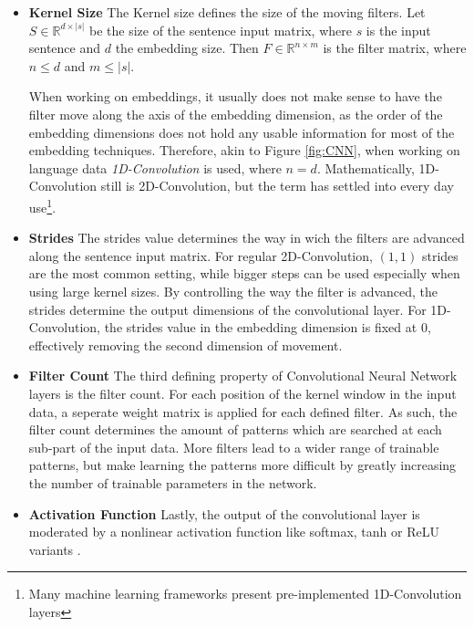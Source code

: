 \documentclass[11pt,a4paper,twoside,openright]{scrbook}
\begin{document}
\begin{itemize}
  \item \textbf{Kernel Size}
    The Kernel size defines the size of the moving filters. Let \(S \in \mathbb{R}^{d\times |s|}\) be the size of the sentence input matrix, where \(s\) is the input sentence and \(d\) the embedding size.
    Then \(F \in \mathbb{R}^{n \times m}\) is the filter matrix, where \(n \leq d\) and \(m \leq |s|\).

    When working on embeddings, it usually does not make sense to have the filter move along the axis of the embedding dimension, as the order of the embedding dimensions does not hold any usable information for most of the embedding techniques. Therefore, akin to Figure \ref{fig:CNN}, when working on language data \emph{1D-Convolution} is used, where \(n = d\). Mathematically, 1D-Convolution still is 2D-Convolution, but the term has settled into every day use\footnote{Many machine learning frameworks present pre-implemented 1D-Convolution layers}.

  \item \textbf{Strides}
    The strides value determines the way in wich the filters are advanced along the sentence input matrix. For regular 2D-Convolution, \((1,1)\) strides are the most common setting, while bigger steps can be used especially when using large kernel sizes. By controlling the way the filter is advanced, the strides determine the output dimensions of the convolutional layer.
    For 1D-Convolution, the strides value in the embedding dimension is fixed at \(0\), effectively removing the second dimension of movement.

  \item \textbf{Filter Count}
    The third defining property of Convolutional Neural Network layers is the filter count. For each position of the kernel window in the input data, a seperate weight matrix is applied for each defined filter. As such, the filter count determines the amount of patterns which are searched at each sub-part of the input data. More filters lead to a wider range of trainable patterns, but make learning the patterns more difficult by greatly increasing the number of trainable parameters in the network.

  \item \textbf{Activation Function}
    Lastly, the output of the convolutional layer is moderated by a nonlinear activation function like softmax, tanh or ReLU variants \cite{Glorot11}.
\end{itemize}
\end{document}
